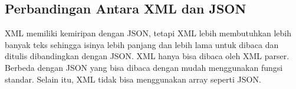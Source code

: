 \documentclass[a4paper]{article}
\begin{document}
\subsection{Perbandingan Antara XML dan JSON}
XML memiliki kemiripan dengan JSON, tetapi XML lebih membutuhkan lebih banyak teks sehingga isinya lebih panjang dan lebih lama untuk dibaca dan ditulis dibandingkan dengan JSON. XML hanya bisa dibaca oleh XML parser. Berbeda dengan JSON yang bisa dibaca dengan mudah menggunakan fungsi standar. Selain itu, XML tidak bisa menggunakan array seperti JSON.
\end{document}
